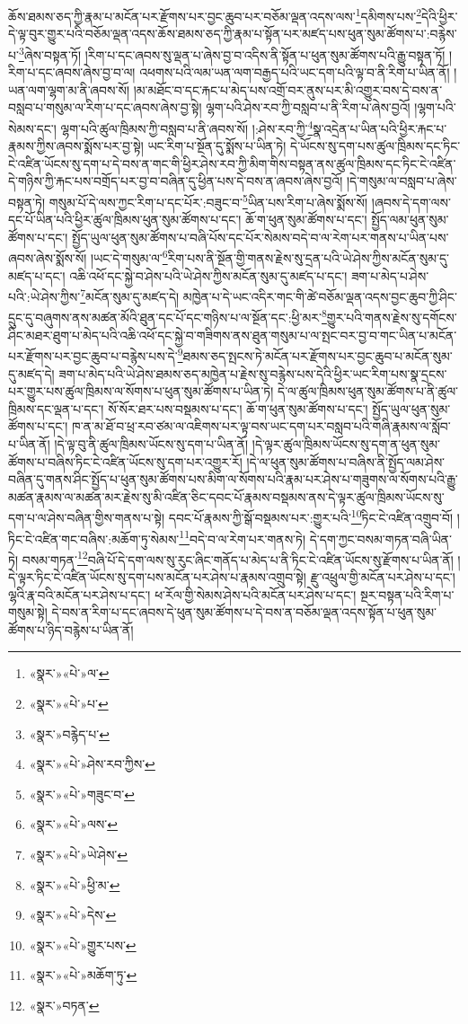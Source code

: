 ཆོས་ཐམས་ཅད་ཀྱི་རྣམ་པ་མངོན་པར་རྫོགས་པར་བྱང་ཆུབ་པར་བཅོམ་ལྡན་འདས་ལས་\footnote{«སྣར་»«པེ་»ལ་}དམིགས་པས་\footnote{«སྣར་»«པེ་»པ་}དེའི་ཕྱིར་དེ་ལྟ་བུར་གྱུར་པའི་བཅོམ་ལྡན་འདས་ཆོས་ཐམས་ཅད་ཀྱི་རྣམ་པ་སྟོན་པར་མཛད་པས་ཕུན་སུམ་ཚོགས་པ་:བརྙེས་པ་\footnote{«སྣར་»བརྙེད་པ་}ཞེས་བསྟན་ཏོ། །རིག་པ་དང་ཞབས་སུ་ལྡན་པ་ཞེས་བྱ་བ་འདིས་ནི་སྟོན་པ་ཕུན་སུམ་ཚོགས་པའི་རྒྱུ་བསྟན་ཏོ། །རིག་པ་དང་ཞབས་ཞེས་བྱ་བ་ལ། འཕགས་པའི་ལམ་ཡན་ལག་བརྒྱད་པའི་ཡང་དག་པའི་ལྟ་བ་ནི་རིག་པ་ཡིན་ནོ། །ཡན་ལག་ལྷག་མ་ནི་ཞབས་སོ། །མ་མཐོང་བ་དང་རྐང་པ་མེད་པས་འགྲོ་བར་ནུས་པར་མི་འགྱུར་བས་དེ་བས་ན་བསླབ་པ་གསུམ་ལ་རིག་པ་དང་ཞབས་ཞེས་བྱ་སྟེ། ལྷག་པའི་ཤེས་རབ་ཀྱི་བསླབ་པ་ནི་རིག་པ་ཞེས་བྱའོ། །ལྷག་པའི་སེམས་དང་། ལྷག་པའི་ཚུལ་ཁྲིམས་ཀྱི་བསླབ་པ་ནི་ཞབས་སོ། །:ཤེས་རབ་ཀྱི་\footnote{«སྣར་»«པེ་»ཤེས་རབ་ཀྱིས་}སྣ་འདྲེན་པ་ཡིན་པའི་ཕྱིར་རྐང་པ་རྣམས་ཀྱིས་ཞབས་སྨོས་པར་བྱ་སྟེ། ཡང་རིག་པ་སྔོན་དུ་སྨོས་པ་ཡིན་ཏེ། དེ་ཡོངས་སུ་དག་པས་ཚུལ་ཁྲིམས་དང་ཏིང་ངེ་འཛིན་ཡོངས་སུ་དག་པ་དེ་བས་ན་གང་གི་ཕྱིར་ཤེས་རབ་ཀྱི་མིག་གིས་བསྟན་ནས་ཚུལ་ཁྲིམས་དང་ཏིང་ངེ་འཛིན་དེ་གཉིས་ཀྱི་རྐང་པས་བགྲོད་པར་བྱ་བ་བཞིན་དུ་ཕྱིན་པས་དེ་བས་ན་ཞབས་ཞེས་བྱའོ། །དེ་གསུམ་ལ་བསླབ་པ་ཞེས་བསྟན་ཏེ། གསུམ་པོ་དེ་ལས་ཀྱང་རིག་པ་དང་པོར་:བཟུང་བ་\footnote{«སྣར་»«པེ་»གཟུང་བ་}ཡིན་པས་རིག་པ་ཞེས་སྨོས་སོ། །ཞབས་དེ་དག་ལས་དང་པོ་ཡིན་པའི་ཕྱིར་ཚུལ་ཁྲིམས་ཕུན་སུམ་ཚོགས་པ་དང་། ཆོ་ག་ཕུན་སུམ་ཚོགས་པ་དང་། སྤྱོད་ལམ་ཕུན་སུམ་ཚོགས་པ་དང་། སྤྱོད་ཡུལ་ཕུན་སུམ་ཚོགས་པ་བཞི་པོས་དང་པོར་སེམས་བདེ་བ་ལ་རེག་པར་གནས་པ་ཡིན་པས་ཞབས་ཞེས་སྨོས་སོ། །ཡང་དེ་གསུམ་ལ་\footnote{«སྣར་»«པེ་»ལས་}རིག་པས་ནི་སྔོན་གྱི་གནས་རྗེས་སུ་དྲན་པའི་ཡེ་ཤེས་ཀྱིས་མངོན་སུམ་དུ་མཛད་པ་དང་། འཆི་འཕོ་དང་སྐྱེ་བ་ཤེས་པའི་ཡེ་ཤེས་ཀྱིས་མངོན་སུམ་དུ་མཛད་པ་དང་། ཟག་པ་མེད་པ་ཤེས་པའི་:ཡེ་ཤེས་ཀྱིས་\footnote{«སྣར་»«པེ་»ཡེ་ཤེས་}མངོན་སུམ་དུ་མཛད་དེ། མཁྱེན་པ་དེ་ཡང་འདིར་གང་གི་ཚེ་བཅོམ་ལྡན་འདས་བྱང་ཆུབ་ཀྱི་ཤིང་དྲུང་དུ་བཞུགས་ནས་མཚན་མོའི་ཐུན་དང་པོ་དང་གཉིས་པ་ལ་སྔོན་དང་:ཕྱི་མར་\footnote{«སྣར་»«པེ་»ཕྱི་མ་}གྱུར་པའི་གནས་རྗེས་སུ་དགོངས་ཤིང་མཐར་ཐུག་པ་མེད་པའི་འཆི་འཕོ་དང་སྐྱེ་བ་གཟིགས་ནས་ཐུན་གསུམ་པ་ལ་སྤང་བར་བྱ་བ་གང་ཡིན་པ་མངོན་པར་རྫོགས་པར་བྱང་ཆུབ་པ་བརྙེས་པས་དེ་\footnote{«སྣར་»«པེ་»དེས་}ཐམས་ཅད་སྤངས་ཏེ་མངོན་པར་རྫོགས་པར་བྱང་ཆུབ་པ་མངོན་སུམ་དུ་མཛད་དེ། ཟག་པ་མེད་པའི་ཡེ་ཤེས་ཐམས་ཅད་མཁྱེན་པ་རྗེས་སུ་བརྙེས་པས་དེའི་ཕྱིར་ཡང་རིག་པས་སྣ་དྲངས་པར་གྱུར་པས་ཚུལ་ཁྲིམས་ལ་སོགས་པ་ཕུན་སུམ་ཚོགས་པ་ཡིན་ཏེ། དེ་ལ་ཚུལ་ཁྲིམས་ཕུན་སུམ་ཚོགས་པ་ནི་ཚུལ་ཁྲིམས་དང་ལྡན་པ་དང་། སོ་སོར་ཐར་པས་བསྡམས་པ་དང་། ཆོ་ག་ཕུན་སུམ་ཚོགས་པ་དང་། སྤྱོད་ཡུལ་ཕུན་སུམ་ཚོགས་པ་དང་། ཁ་ན་མ་ཐོ་བ་ཕྲ་རབ་ཙམ་ལ་འཇིགས་པར་ལྟ་བས་ཡང་དག་པར་བསླབ་པའི་གཞི་རྣམས་ལ་སློབ་པ་ཡིན་ནོ། །དེ་ལྟ་བུ་ནི་ཚུལ་ཁྲིམས་ཡོངས་སུ་དག་པ་ཡིན་ནོ། །དེ་ལྟར་ཚུལ་ཁྲིམས་ཡོངས་སུ་དག་ན་ཕུན་སུམ་ཚོགས་པ་བཞིས་ཏིང་ངེ་འཛིན་ཡོངས་སུ་དག་པར་འགྱུར་རོ། །དེ་ལ་ཕུན་སུམ་ཚོགས་པ་བཞིས་ནི་སྤྱོད་ལམ་ཤེས་བཞིན་དུ་གནས་ཤིང་སྤྱོད་པ་ཕུན་སུམ་ཚོགས་པས་མིག་ལ་སོགས་པའི་རྣམ་པར་ཤེས་པ་གཟུགས་ལ་སོགས་པའི་རྒྱུ་མཚན་རྣམས་ལ་མཚན་མར་རྗེས་སུ་མི་འཛིན་ཅིང་དབང་པོ་རྣམས་བསྡམས་ནས་དེ་ལྟར་ཚུལ་ཁྲིམས་ཡོངས་སུ་དག་པ་ལ་ཤེས་བཞིན་གྱིས་གནས་པ་སྟེ། དབང་པོ་རྣམས་ཀྱི་སྒོ་བསྡམས་པར་:གྱུར་པའི་\footnote{«སྣར་»«པེ་»གྱུར་པས་}ཏིང་ངེ་འཛིན་འགྲུབ་བོ། །ཏིང་ངེ་འཛིན་གང་བཞིས་:མཆོག་ཏུ་སེམས་\footnote{«སྣར་»«པེ་»མཆོག་ཏུ་}བདེ་བ་ལ་རེག་པར་གནས་ཏེ། དེ་དག་ཀྱང་བསམ་གཏན་བཞི་ཡིན་ཏེ། བསམ་གཏན་\footnote{«སྣར་»བཏན་}བཞི་པོ་དེ་དག་ལས་སུ་རུང་ཞིང་གནོད་པ་མེད་པ་ནི་ཏིང་ངེ་འཛིན་ཡོངས་སུ་རྫོགས་པ་ཡིན་ནོ། །དེ་ལྟར་ཏིང་ངེ་འཛིན་ཡོངས་སུ་དག་པས་མངོན་པར་ཤེས་པ་རྣམས་འགྲུབ་སྟེ། རྫུ་འཕྲུལ་གྱི་མངོན་པར་ཤེས་པ་དང་། ལྷའི་རྣ་བའི་མངོན་པར་ཤེས་པ་དང་། ཕ་རོལ་གྱི་སེམས་ཤེས་པའི་མངོན་པར་ཤེས་པ་དང་། སྔར་བསྟན་པའི་རིག་པ་གསུམ་སྟེ། དེ་བས་ན་རིག་པ་དང་ཞབས་དེ་ཕུན་སུམ་ཚོགས་པ་དེ་བས་ན་བཅོམ་ལྡན་འདས་སྟོན་པ་ཕུན་སུམ་ཚོགས་པ་ཉིད་བརྙེས་པ་ཡིན་ནོ། 